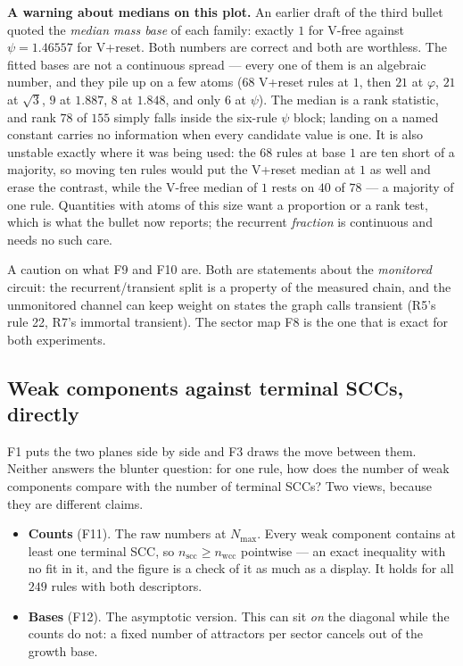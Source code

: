\documentclass[11pt]{article}
\newcommand{\wcc}{\mathrm{wcc}}
\newcommand{\scc}{\mathrm{scc}}
\theoremstyle{plain}
\theoremstyle{definition}
\begin{document}
\noindent \textbf{A warning about medians on this plot.} An earlier draft of the
third bullet quoted the \emph{median mass base} of each family: exactly $1$ for
V-free against $\psi=1.46557$ for V+reset. Both numbers are correct and both are
worthless. The fitted bases are not a continuous spread --- every one of them is
an algebraic number, and they pile up on a few atoms ($68$ V+reset rules at $1$,
then $21$ at $\varphi$, $21$ at $\sqrt3$, $9$ at $1.887$, $8$ at $1.848$, and
only $6$ at $\psi$). The median is a rank statistic, and rank $78$ of $155$ simply
falls inside the six-rule $\psi$ block; landing on a named constant carries no
information when every candidate value is one. It is also unstable exactly where
it was being used: the $68$ rules at base $1$ are ten short of a majority, so
moving ten rules would put the V+reset median at $1$ as well and erase the
contrast, while the V-free median of $1$ rests on $40$ of $78$ --- a majority of
one rule. Quantities with atoms of this size want a proportion or a rank test,
which is what the bullet now reports; the recurrent \emph{fraction} is continuous
and needs no such care.

\noindent A caution on what F9 and F10 are. Both are statements about the
\emph{monitored} circuit: the recurrent/transient split is a property of the
measured chain, and the unmonitored channel can keep weight on states the graph
calls transient (R5's rule 22, R7's immortal transient). The sector map F8 is the
one that is exact for both experiments.

\subsection{Weak components against terminal SCCs, directly}
\label{sec:wccscc}

F1 puts the two planes side by side and F3 draws the move between them. Neither
answers the blunter question: for one rule, how does the number of weak
components compare with the number of terminal SCCs? Two views, because they are
different claims.

\begin{itemize}
\item \textbf{Counts} (F11). The raw numbers at $N_{\max}$. Every weak component
  contains at least one terminal SCC, so $n_\scc \ge n_\wcc$ pointwise --- an
  exact inequality with no fit in it, and the figure is a check of it as much as
  a display. It holds for all $249$ rules with both descriptors.
\item \textbf{Bases} (F12). The asymptotic version. This can sit \emph{on} the
  diagonal while the counts do not: a fixed number of attractors per sector
  cancels out of the growth base.
\end{itemize}
\end{document}
